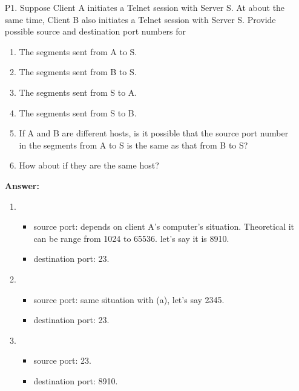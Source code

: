 \begin{enumerate}
    \item [P1.] Suppose Client A initiates a Telnet session with Server S. At about the same time, Client B also initiates a Telnet session with Server S. Provide possible source and destination port numbers for
    
    \begin{enumerate}
        \item The segments sent from A to S.
        
        \item The segments sent from B to S.
        
        \item The segments sent from S to A.
        
        \item The segments sent from S to B.
        
        \item If A and B are different hosts, is it possible that the source port number in the segments from A to S is the same as that from B to S?
        
        \item How about if they are the same host?        
    \end{enumerate}
    
    \textbf{Answer:}
    
    \begin{enumerate}
        \item \begin{itemize}
            \item source port: depends on client A's computer's situation. Theoretical it can be range from 1024 to 65536. let's say it is 8910. 
            \item destination port: 23.
        \end{itemize}
        
        \item \begin{itemize}
            \item source port: same situation with (a), let's say 2345.
            \item destination port: 23.
        \end{itemize}
        
        \item \begin{itemize}
            \item source port: 23.
            \item destination port: 8910.
        \end{itemize}
        

\end{enumerate}
\end{enumerate}
